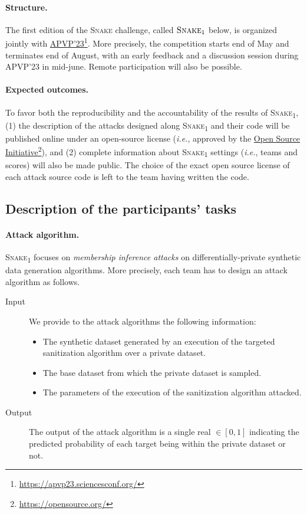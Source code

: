 \documentclass{article}
\newcommand{\myhref}[2]{\href{#1}{#2}\footnote{\url{#1}}}
\newcommand{\name}{\textsc{Snake}\xspace}
\begin{document}
\paragraph{Structure.}
The first edition of the \name challenge, called $\name_{1}$ below, is organized jointly with \myhref{https://apvp23.sciencesconf.org/}{APVP'23}.
More precisely, the competition starts end of May and terminates end of August, with an early feedback and a discussion session during APVP'23 in mid-june.
Remote participation will also be possible.

\paragraph{Expected outcomes.}
To favor both the reproducibility and the accountability of the results of \name\textsubscript{1}, (1) the description of the attacks designed along \name\textsubscript{1} and their code will be published online under an open-source license (\emph{i.e.}, approved by the \myhref{https://opensource.org/}{Open Source Initiative}), and (2) complete information about \name\textsubscript{1} settings (\emph{i.e.}, teams and scores) will also be made public.
The choice of the exact open source license of each attack source code is left to the team having written the code.

\subsection{Description of the participants' tasks}

\paragraph{Attack algorithm.}
\name\textsubscript{1} focuses on \emph{membership inference attacks} on differentially-private synthetic data generation algorithms.
More precisely, each team has to design an attack algorithm as follows.
\begin{description}
\item [Input] We provide to the attack algorithms the following information:
  \begin{itemize}
  \item The synthetic dataset generated by an execution of the targeted sanitization algorithm over a private dataset.
  \item The base dataset from which the private dataset is sampled.
  \item The parameters of the execution of the sanitization algorithm attacked.
  \end{itemize}

\item [Output] The output of the attack algorithm is a single real $\in [0, 1]$ indicating the predicted probability of each target being within the private dataset or not.
\end{description}
\end{document}
